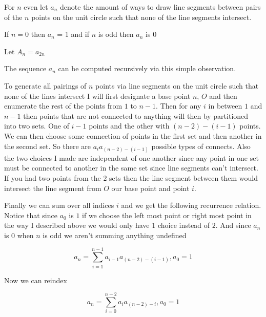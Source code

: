 \documentclass[paper=a4,fontsize=paper,12.5pt]{book}
\newcommand{\3}{\vspace*{3mm}}
\begin{document}
\3

\begin{definition}

For $n$ even let ${a}_{n}$ denote the amount of ways to draw line segments between pairs of the $n$ points on the unit circle such that none of the line segments intersect. 

\3

If $n = 0$ then ${a}_{n}$ = 1 and if $n$ is odd then ${a}_{n}$ is $0$

\3

Let ${A}_{n} = {a}_{2n}$


\end{definition}


\3

The sequence ${a}_{n}$ can be computed recursively via this simple observation.

\3

To generate all pairings of $n$ points via line segments on the unit circle such that none of the lines intersect I will first designate a base point $n$, $O$ and then enumerate the rest of the points from $1$ to $n-1$. Then for any $i$ in between $1$ and $n-1$ then points that are not connected to anything will then by partitioned into two sets. One of $i-1$ points and the other with $(n-2) - (i-1)$ points. We can then choose some connection of points in the first set and then another in the second set. So there are ${a}_{i}{a}_{(n-2) - (i-1)}$ possible types of connects. Also the two choices I made are independent of one another since any point in one set must be connected to another in the same set since line segments can't intersect. If you had two points from the $2$ sets then the line segment between them would intersect the line segment from $O$ our base point and point $i$. 

\newpage

Finally we can sum over all indices $i$ and we get the following recurrence relation. Notice that since ${a}_{0}$ is $1$ if we choose the left most point or right most point in the way I described above we would only have $1$ choice instead of $2$. And since ${a}_{n}$ is $0$ when $n$ is odd we aren't summing anything undefined 

\3

\[{a}_{n} =  \sum\limits_{i = 1}^{n-1}{a}_{i-1}{a}_{(n-2) - (i-1)}, {a}_{0} =1\] 

Now we can reindex

\[{a}_{n} = \sum\limits_{i = 0}^{n-2}{a}_{i}{a}_{(n-2) - i}, {a}_{0} = 1\]
\end{document}
